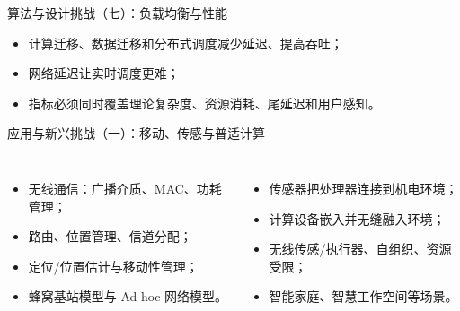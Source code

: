 \documentclass[UTF8,fontset=none,aspectratio=169,10pt]{beamer}
\begin{document}
\begin{frame}{算法与设计挑战（七）：负载均衡与性能}
\begin{center}\end{center}
\vfill\begin{itemize}\item 计算迁移、数据迁移和分布式调度减少延迟、提高吞吐；\item 网络延迟让实时调度更难；\item 指标必须同时覆盖理论复杂度、资源消耗、尾延迟和用户感知。\end{itemize}
\end{frame}

\begin{frame}{应用与新兴挑战（一）：移动、传感与普适计算}
\begin{columns}[T,onlytextwidth]
\begin{itemize}
  \item 无线通信：广播介质、MAC、功耗管理；
  \item 路由、位置管理、信道分配；
  \item 定位/位置估计与移动性管理；
  \item 蜂窝基站模型与 Ad-hoc 网络模型。
\end{itemize}
\begin{itemize}
  \item 传感器把处理器连接到机电环境；
  \item 计算设备嵌入并无缝融入环境；
  \item 无线传感/执行器、自组织、资源受限；
  \item 智能家庭、智慧工作空间等场景。
\end{itemize}
\end{columns}
\end{frame}
\end{document}
